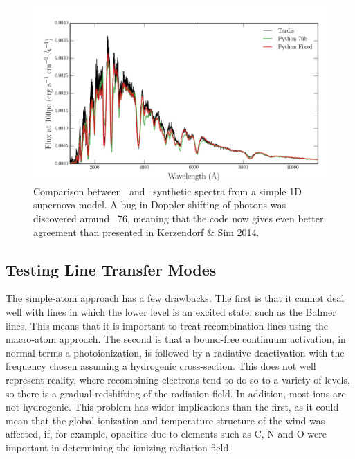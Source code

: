 \begin{figure}
\centering
\includegraphics[width=1.0\textwidth]{figures/03-radtrans/tardispython_thesis.png}
\caption[Comparison between \tar\ and \py\ synthetic spectra from 
a simple 1D supernova model.]
{
Comparison between \tar\ and \py\ synthetic spectra from 
a simple 1D supernova model. A bug in Doppler shifting of
photons was discovered around \py\ 76, meaning that the code now gives
even better agreement than presented in Kerzendorf \& Sim 2014.
}
\label{fig:tardis_spec}
\end{figure}

\subsection{Testing Line Transfer Modes}
\label{sec:line_test}
The simple-atom approach has a few drawbacks. The first is that it cannot
deal well with lines in which the lower level is an excited state, such as the 
Balmer lines. This means that it is important to treat recombination lines using the 
macro-atom approach. The second is that a bound-free continuum activation, 
in normal terms a photoionization, is followed by a radiative deactivation
with the frequency chosen assuming a hydrogenic cross-section. 
This does not well represent reality, where recombining
electrons tend to do so to a variety of levels, so there is a gradual
redshifting of the radiation field. In addition, most ions are not hydrogenic. 
This problem has wider implications than
the first, as it could mean that the global ionization and temperature structure of the wind
was affected, if, for example, opacities due to elements such as C, N and O were important
in determining the ionizing radiation field.

